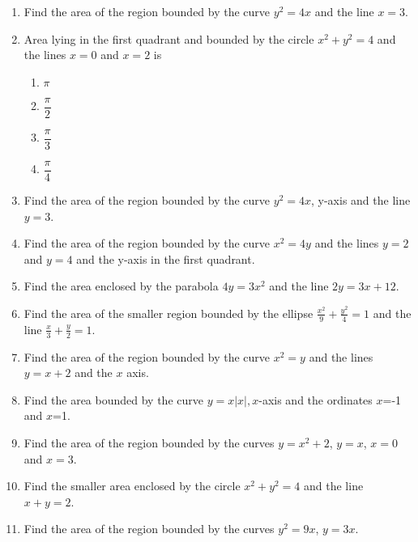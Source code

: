 \begin{enumerate}[label=\thesubsection.\arabic*,ref=\thesubsection.\theenumi]

\item Find the area of the region bounded by the curve ${y}^2
= 4{x}$ and the line ${x} = 3$.
\label{chapters/12/8/1/11}
\item Area lying in the first quadrant and bounded by the circle ${x}^2 + {y}^2 = 4$ and the lines ${x} = 0$ and ${x} = 2$ is 
\label{chapters/12/8/1/12}
\begin{enumerate}[itemsep=+2mm]
\item $\pi$
\item $\dfrac{\pi}{2}$
\item $\dfrac{\pi}{3}$  
\item $\dfrac{\pi}{4}$
\end{enumerate}
\item Find the area of the region bounded by the curve $y^2 = 4x$, y-axis and the line $y = 3$. 
\label{chapters/12/8/1/13}
\\
\solution

\item 
Find the area of the region bounded by the curve $x^2=4y$ and the lines $y=2$ and $y=4$ and the y-axis in the first quadrant.
\\
\solution
\label{chapters/12/8/3/3}

\item 
	Find the area enclosed by the parabola $4y=3x^2 $ and the line $2y=3x+12$.\\
	\solution
\label{chapters/12/8/3/7}

\item 
	Find the area of the smaller region bounded by the ellipse $\frac{x^2}{9}+\frac{y^2}{4}=1$
and the line $\frac{x}{3}+\frac{y}{2}=1$.\\
\solution
\label{chapters/12/8/3/8}

\item 
Find the area of the region bounded by the curve $x^2=y$ and the lines $y=x+2$ and the $x$ axis.
\label{chapters/12/8/3/10}
\item 
Find   the area bounded by the curve $y=x|x|, x$-axis and the ordinates $x$=-1 and $x$=1.
\label{chapters/12/8/3/17}
\item 
	Find the area of the region bounded by the curves $y=x^2+2$, $y=x$, $x=0$ and $x=3. $
\label{chapters/12/8/2/3}
\item 
Find the smaller area enclosed by the circle $x^2 + y^2 = 4$ and the line $x + y = 2$. 
\\
\solution
\label{chapters/12/8/2/6}

\item Find the area of the region bounded by the curves $y^2 = 9x$, $y = 3x$.

\end{enumerate}
